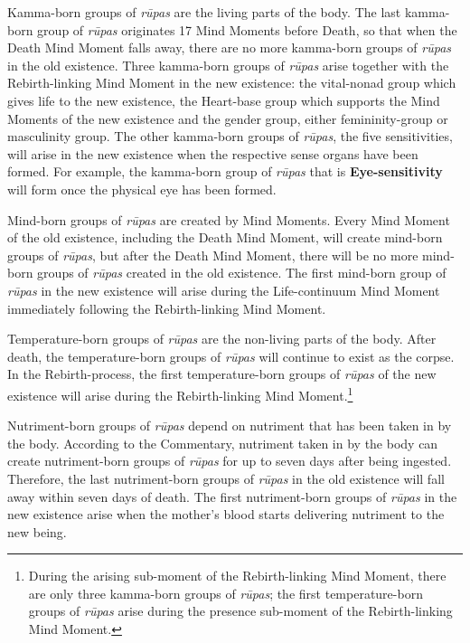Kamma-born groups of \textit{rūpas} are the living parts of the body. The last kamma-born group of \textit{rūpas} originates 17 Mind Moments before Death, so that when the Death Mind Moment falls away, there are no more kamma-born groups of \textit{rūpas} in the old existence. Three kamma-born groups of \textit{rūpas} arise together with the Rebirth-linking Mind Moment in the new existence: the vital-nonad group which gives life to the new existence, the Heart-base group which supports the Mind Moments of the new existence and the gender group, either femininity-group or masculinity group. The other kamma-born groups of \textit{rūpas}, the five sensitivities, will arise in the new existence when the respective sense organs have been formed. For example, the kamma-born group of \textit{rūpas} that is \textbf{Eye-sensitivity} will form once the physical eye has been formed.

Mind-born groups of \textit{rūpas} are created by Mind Moments. Every Mind Moment of the old existence, including the Death Mind Moment, will create mind-born groups of \textit{rūpas}, but after the Death Mind Moment, there will be no more mind-born groups of \textit{rūpas} created in the old existence. The first mind-born group of \textit{rūpas} in the new existence will arise during the Life-continuum Mind Moment immediately following the Rebirth-linking Mind Moment.

Temperature-born groups of \textit{rūpas} are the non-living parts of the body. After death, the temperature-born groups of \textit{rūpas} will continue to exist as the corpse. In the Rebirth-process, the first temperature-born groups of \textit{rūpas} of the new existence will arise during the Rebirth-linking Mind Moment.\footnote{During the arising sub-moment of the Rebirth-linking Mind Moment, there are only three kamma-born groups of \textit{rūpas}; the first temperature-born groups of \textit{rūpas} arise during the presence sub-moment of the Rebirth-linking Mind Moment.}

Nutriment-born groups of \textit{rūpas} depend on nutriment that has been taken in by the body. According to the Commentary, nutriment taken in by the body can create nutriment-born groups of \textit{rūpas} for up to seven days after being ingested. Therefore, the last nutriment-born groups of \textit{rūpas} in the old existence will fall away within seven days of death. The first nutriment-born groups of \textit{rūpas} in the new existence arise when the mother’s blood starts delivering nutriment to the new being.

